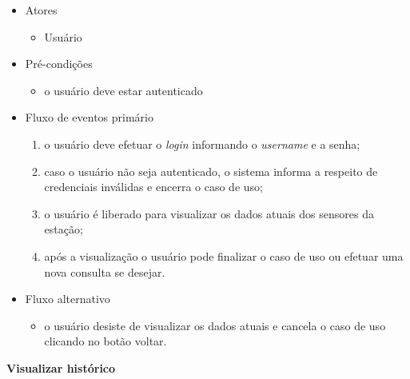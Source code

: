 \begin{itemize}
    \item Atores
    \begin{itemize}
        \item Usuário
    \end{itemize}
    
    \item Pré-condições
    \begin{itemize}
        \item o usuário deve estar autenticado
    \end{itemize}

    \item Fluxo de eventos primário
    \begin{enumerate}
        \item o usuário deve efetuar o \textit{login} informando o \textit{username} e a senha;
        \item caso o usuário não seja autenticado, o sistema informa a respeito de credenciais inválidas e encerra o caso de uso;
        \item o usuário é liberado para visualizar os dados atuais dos sensores da estação;
        \item após a visualização o usuário pode finalizar o caso de uso ou efetuar uma nova consulta se desejar.
    \end{enumerate}

    \item Fluxo alternativo
    \begin{itemize}
       \item o usuário desiste de visualizar os dados atuais e cancela o caso de uso clicando no botão voltar.
    \end{itemize}

\end{itemize}

\textbf{Visualizar histórico}

